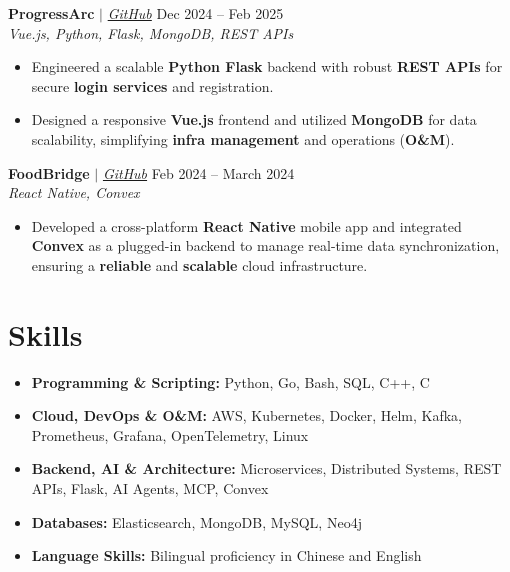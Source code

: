 \documentclass[10pt, letterpaper]{article}
\begin{document}
\textbf{ProgressArc} $|$
\href{https://github.com/honhaoyuan0/ProgressArc}{\textit{GitHub}} \hfill Dec 2024 -- Feb 2025 \\
\textit{Vue.js, Python, Flask, MongoDB, REST APIs}
\begin{itemize}[leftmargin=0.2in, itemsep=4pt, parsep=2pt, topsep=4pt]
    \item Engineered a scalable \textbf{Python Flask} backend with robust \textbf{REST APIs} for secure \textbf{login services} and registration.
    \item Designed a responsive \textbf{Vue.js} frontend and utilized \textbf{MongoDB} for data scalability, simplifying \textbf{infra management} and operations (\textbf{O\&M}).
\end{itemize}
\vspace{8pt}

\textbf{FoodBridge} $|$
\href{https://github.com/tanhaoen/FoodBridge}{\textit{GitHub}} \hfill Feb 2024 -- March 2024 \\
\textit{React Native, Convex}
\begin{itemize}[leftmargin=0.2in, itemsep=4pt, parsep=2pt, topsep=4pt]
    \item Developed a cross-platform \textbf{React Native} mobile app and integrated \textbf{Convex} as a plugged-in backend to manage real-time data synchronization, ensuring a \textbf{reliable} and \textbf{scalable} cloud infrastructure.
\end{itemize}

\section{Skills}
\begin{itemize}[leftmargin=0.2in, itemsep=4pt, parsep=2pt, topsep=4pt]
    \item \textbf{Programming \& Scripting:} Python, Go, Bash, SQL, C++, C
    \item \textbf{Cloud, DevOps \& O\&M:} AWS, Kubernetes, Docker, Helm, Kafka, Prometheus, Grafana, OpenTelemetry, Linux
    \item \textbf{Backend, AI \& Architecture:} Microservices, Distributed Systems, REST APIs, Flask, AI Agents, MCP, Convex
    \item \textbf{Databases:} Elasticsearch, MongoDB, MySQL, Neo4j
    \item \textbf{Language Skills:} Bilingual proficiency in Chinese and English
\end{itemize}
\end{document}
